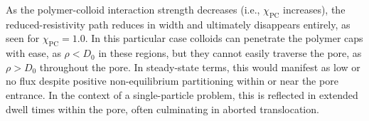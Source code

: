 \documentclass[12pt, a4paper]{article}
\begin{document}






As the polymer-colloid interaction strength decreases (i.e., $\chi_{\text{PC}}$ increases), the reduced-resistivity path reduces in width and ultimately disappears entirely, as seen for $\chi_{\text{PC}} = 1.0$.
In this particular case colloids can penetrate the polymer caps with ease, as $\rho < D_0$ in these regions, but they cannot easily traverse the pore, as $\rho > D_0$ throughout the pore. 
In steady-state terms, this would manifest as low or no flux despite positive non-equilibrium partitioning within or near the pore entrance. In the context of a single-particle problem, this is reflected in extended dwell times within the pore, often culminating in aborted translocation.
\end{document}
